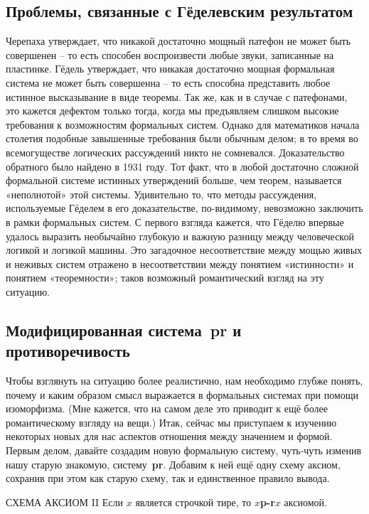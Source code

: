 \documentclass[../main.tex]{subfiles}
\begin{document}
\subsection{Проблемы, связанные с Гёделевским результатом}

Черепаха утверждает, что никакой достаточно мощный патефон не может быть совершенен \--- то есть способен воспроизвести любые звуки, записанные на пластинке. Гёдель утверждает, что никакая достаточно мощная формальная система не может быть совершенна \--- то есть способна представить любое истинное высказывание в виде теоремы. Так же, как и в случае с патефонами, это кажется дефектом только тогда, когда мы предъявляем слишком высокие требования к возможностям формальных систем. Однако для математиков начала столетия подобные завышенные требования были обычным делом; в то время во всемогуществе логических рассуждений никто не сомневался. Доказательство обратного было найдено в 1931 году. Тот факт, что в любой достаточно сложной формальной системе истинных утверждений больше, чем теорем, называется «неполнотой» этой системы. Удивительно то, что методы рассуждения, используемые Гёделем в его доказательстве, по-видимому, невозможно заключить в рамки формальных систем. С первого взгляда кажется, что Гёделю впервые удалось выразить необычайно глубокую и важную разницу между человеческой логикой и логикой машины. Это загадочное несоответствие между мощью живых и неживых систем отражено в несоответствии между понятием «истинности» и понятием «теоремности»; таков возможный романтический взгляд на эту ситуацию.


\subsection{Модифицированная система~\textbf{pr} и противоречивость}

Чтобы взглянуть на ситуацию более реалистично, нам необходимо глубже понять, почему и каким образом смысл выражается в формальных системах при помощи изоморфизма. (Мне кажется, что на самом деле это приводит к ещё более романтическому взгляду на вещи.) Итак, сейчас мы приступаем к изучению некоторых новых для нас аспектов отношения между значением и формой. Первым делом, давайте создадим новую формальную систему, чуть-чуть изменив нашу старую знакомую, систему~\textbf{pr}. Добавим к ней ещё одну схему аксиом, сохранив при этом как старую схему, так и единственное правило вывода.

\begin{mybox}{СХЕМА АКСИОМ II}
    Если $x$ является строчкой тире, то \textbf{$x$p-r$x$} аксиомой.
\end{mybox}
\end{document}
